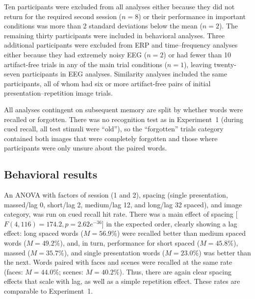 

Ten participants were excluded from all analyses either because they did not return for the required second session ($n=8$) or their performance in important conditions was more than 2 standard deviations below the mean ($n=2$).  The remaining thirty participants were included in behavioral analyses.
Three additional participants were excluded from ERP and time--frequency analyses either because they had extremely noisy EEG ($n=2$) or had fewer than 10 artifact-free trials in any of the main trial conditions ($n=1$), leaving twenty-seven participants in EEG analyses.  Similarity analyses included the same participants, all of whom had six or more artifact-free pairs of initial presentation--repetition image trials.

All analyses contingent on subsequent memory are split by whether words were recalled or forgotten.  There was no recognition test as in Experiment~1 (during cued recall, all test stimuli were ``old''), so the ``forgotten'' trials category contained both images that were completely forgotten and those where participants were only unsure about the paired words.

\subsection{Behavioral results}

An ANOVA with factors of session (1 and 2), spacing (single presentation, massed/lag 0, short/lag 2, medium/lag 12, and long/lag 32 spaced), and image category, was run on cued recall hit rate.  There was a main effect of spacing [$F(4,116)=174.2, p=2.62e^{-36}$] in the expected order, clearly showing a lag effect: long spaced words ($M=56.9\%$) were recalled better than medium spaced words ($M=49.2\%$), and, in turn, performance for short spaced ($M=45.8\%$), massed ($M=35.7\%$), and single presentation words ($M=23.0\%$) was better than the next.  Words paired with faces and scenes were recalled at the same rate (faces: $M=44.0\%$; scenes: $M=40.2\%$).  Thus, there are again clear spacing effects that scale with lag, as well as a simple repetition effect. These rates are comparable to Experiment~1.

